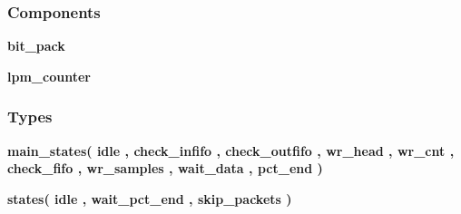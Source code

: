 \subsubsection*{Components}
 \begin{DoxyCompactItemize}
\item 
{\bf bit\+\_\+pack}  {\bfseries }  
\item 
{\bf lpm\+\_\+counter}  {\bfseries }  
\end{DoxyCompactItemize}
\subsubsection*{Types}
 \begin{DoxyCompactItemize}
\item 
{\bfseries {\bf main\+\_\+states}{\bfseries \textcolor{vhdlchar}{(}\textcolor{vhdlchar}{ }\textcolor{vhdlchar}{idle}\textcolor{vhdlchar}{ }\textcolor{vhdlchar}{,}\textcolor{vhdlchar}{ }\textcolor{vhdlchar}{check\+\_\+infifo}\textcolor{vhdlchar}{ }\textcolor{vhdlchar}{,}\textcolor{vhdlchar}{ }\textcolor{vhdlchar}{check\+\_\+outfifo}\textcolor{vhdlchar}{ }\textcolor{vhdlchar}{,}\textcolor{vhdlchar}{ }\textcolor{vhdlchar}{wr\+\_\+head}\textcolor{vhdlchar}{ }\textcolor{vhdlchar}{,}\textcolor{vhdlchar}{ }\textcolor{vhdlchar}{wr\+\_\+cnt}\textcolor{vhdlchar}{ }\textcolor{vhdlchar}{,}\textcolor{vhdlchar}{ }\textcolor{vhdlchar}{check\+\_\+fifo}\textcolor{vhdlchar}{ }\textcolor{vhdlchar}{,}\textcolor{vhdlchar}{ }\textcolor{vhdlchar}{wr\+\_\+samples}\textcolor{vhdlchar}{ }\textcolor{vhdlchar}{,}\textcolor{vhdlchar}{ }\textcolor{vhdlchar}{wait\+\_\+data}\textcolor{vhdlchar}{ }\textcolor{vhdlchar}{,}\textcolor{vhdlchar}{ }\textcolor{vhdlchar}{pct\+\_\+end}\textcolor{vhdlchar}{ }\textcolor{vhdlchar}{)}\textcolor{vhdlchar}{ }}} 
\item 
{\bfseries {\bf states}{\bfseries \textcolor{vhdlchar}{(}\textcolor{vhdlchar}{ }\textcolor{vhdlchar}{idle}\textcolor{vhdlchar}{ }\textcolor{vhdlchar}{,}\textcolor{vhdlchar}{ }\textcolor{vhdlchar}{wait\+\_\+pct\+\_\+end}\textcolor{vhdlchar}{ }\textcolor{vhdlchar}{,}\textcolor{vhdlchar}{ }\textcolor{vhdlchar}{skip\+\_\+packets}\textcolor{vhdlchar}{ }\textcolor{vhdlchar}{)}\textcolor{vhdlchar}{ }}} 
\end{DoxyCompactItemize}
